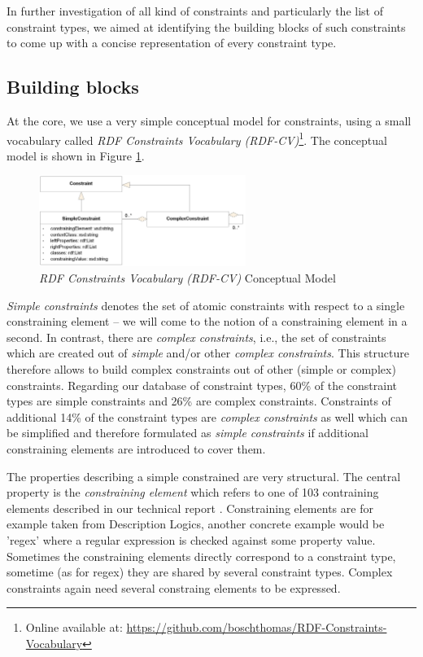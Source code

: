 \documentclass[a4paper,fontsize=11pt]{scrartcl}
\begin{document}
In further investigation of all kind of constraints and particularly the list of constraint types, we aimed at identifying the building blocks of such constraints to come up with a concise representation of every constraint type. 


\subsection{Building blocks}

At the core, we use a very simple conceptual model for constraints, using a small vocabulary called \emph{RDF Constraints Vocabulary (RDF-CV)}\footnote{Online available at: \url{https://github.com/boschthomas/RDF-Constraints-Vocabulary}}. The conceptual model is shown in Figure \ref{fig:RDF-CV-conceptual-model}.
\begin{figure}[H]
	\centering
		\includegraphics[width=0.60\textwidth]{images/RDF-CV.png}
	\caption{\emph{RDF Constraints Vocabulary (RDF-CV)} Conceptual Model}
	\label{fig:RDF-CV-conceptual-model}
\end{figure}

\emph{Simple constraints} denotes the set of atomic constraints with respect to a single constraining element -- we will come to the notion of a constraining element in a second. In contrast, there are  
\emph{complex constraints}, i.e., the set of constraints which are created out of \emph{simple} and/or other \emph{complex constraints}. This structure therefore allows to build complex constraints out of other (simple or complex) constraints. Regarding our database of constraint types, 60\% of the constraint types are simple constraints and 26\% are complex constraints. 
Constraints of additional 14\% of the constraint types are \emph{complex constraints} as well which can be simplified and therefore formulated as \emph{simple constraints} if additional constraining elements are introduced to cover them.

The properties describing a simple constrained are very structural. The central property is the \emph{constraining element} which refers to one of 103 contraining elements described in our technical report \cite{BoschNolleAcarEckert2015}. Constraining elements are for example taken from Description Logics, another concrete example would be 'regex' where a regular expression is checked against some property value. Sometimes the constraining elements directly correspond to a constraint type, sometime (as for regex) they are shared by several constraint types. Complex constraints again need several constraing elements to be expressed.
\end{document}
